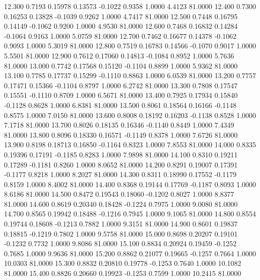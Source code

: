   12.300   0.7193   0.15978   0.13573  -0.1022   0.9358   1.0000   4.4123  81.0000
  12.400   0.7300   0.16253   0.13828  -0.1039   0.9262   1.0000   4.7417  81.0000
  12.500   0.7448   0.16795   0.14149  -0.1062   0.9200   1.0000   4.9530  81.0000
  12.600   0.7468   0.16832   0.14284  -0.1064   0.9163   1.0000   5.0759  81.0000
  12.700   0.7462   0.16677   0.14378  -0.1062   0.9093   1.0000   5.3019  81.0000
  12.800   0.7519   0.16783   0.14566  -0.1070   0.9017   1.0000   5.5501  81.0000
  12.900   0.7612   0.17060   0.14813  -0.1084   0.8952   1.0000   5.7636  81.0000
  13.000   0.7742   0.17568   0.15120  -0.1104   0.8899   1.0000   5.9362  81.0000
  13.100   0.7785   0.17737   0.15299  -0.1110   0.8863   1.0000   6.0539  81.0000
  13.200   0.7757   0.17471   0.15366  -0.1104   0.8797   1.0000   6.2742  81.0000
  13.300   0.7808   0.17547   0.15551  -0.1110   0.8709   1.0000   6.5671  81.0000
  13.400   0.7925   0.17934   0.15840  -0.1128   0.8628   1.0000   6.8381  81.0000
  13.500   0.8061   0.18564   0.16166  -0.1148   0.8575   1.0000   7.0150  81.0000
  13.600   0.8008   0.18192   0.16203  -0.1138   0.8528   1.0000   7.1718  81.0000
  13.700   0.8026   0.18135   0.16346  -0.1140   0.8449   1.0000   7.4349  81.0000
  13.800   0.8096   0.18330   0.16571  -0.1149   0.8378   1.0000   7.6726  81.0000
  13.900   0.8198   0.18713   0.16850  -0.1164   0.8323   1.0000   7.8553  81.0000
  14.000   0.8335   0.19396   0.17191  -0.1185   0.8283   1.0000   7.9898  81.0000
  14.100   0.8310   0.19211   0.17289  -0.1181   0.8260   1.0000   8.0652  81.0000
  14.200   0.8291   0.19007   0.17391  -0.1177   0.8218   1.0000   8.2027  81.0000
  14.300   0.8311   0.18990   0.17552  -0.1179   0.8159   1.0000   8.4002  81.0000
  14.400   0.8368   0.19144   0.17769  -0.1187   0.8093   1.0000   8.6186  81.0000
  14.500   0.8472   0.19543   0.18060  -0.1202   0.8027   1.0000   8.8377  81.0000
  14.600   0.8619   0.20340   0.18428  -0.1224   0.7975   1.0000   9.0080  81.0000
  14.700   0.8565   0.19942   0.18488  -0.1216   0.7945   1.0000   9.1065  81.0000
  14.800   0.8554   0.19744   0.18608  -0.1213   0.7882   1.0000   9.3151  81.0000
  14.900   0.8601   0.19837   0.18815  -0.1219   0.7802   1.0000   9.5758  81.0000
  15.000   0.8698   0.20207   0.19101  -0.1232   0.7732   1.0000   9.8086  81.0000
  15.100   0.8834   0.20924   0.19459  -0.1252   0.7685   1.0000   9.9636  81.0000
  15.200   0.8862   0.21077   0.19665  -0.1257   0.7664   1.0000  10.0303  81.0000
  15.300   0.8832   0.20810   0.19778  -0.1253   0.7640   1.0000  10.1082  81.0000
  15.400   0.8826   0.20660   0.19923  -0.1253   0.7599   1.0000  10.2415  81.0000

